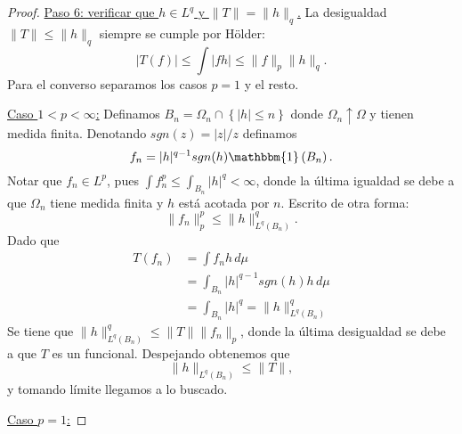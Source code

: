 \documentclass{article}
\theoremstyle{plain}
\theoremstyle{definition}
\newcommand{\1}[1]{\mathbbm{1}\left( #1 \right)}
\newcommand{\abs}[1]{\lvert #1 \rvert}
\newcommand{\norm}[1]{\lVert #1 \rVert}
\begin{document}
\begin{proof}
  \underline{Paso 6: verificar que \(h\in L^q\) y \(\norm{T} = \norm{h}_{q}\).}
  La desigualdad \(\norm{T} \le \norm{h}_{q}\) siempre se cumple por Hölder:
  \begin{displaymath}
    \abs{T(f)} \le \int \abs{fh} \le \norm{f}_{p} \norm{h}_{q}.
  \end{displaymath}
  Para el converso separamos los casos \(p=1\) y el resto.
  
  \noindent\underline{Caso \(1 < p < \infty\):} Definamos \(B_n = \Omega_n \cap \left\{ \abs{h} \le n \right\} \)
  donde \(\Omega_n \uparrow \Omega\) y tienen medida finita. Denotando \(sgn(z) = \abs{z}/z\) 
  definamos 
  \begin{displaymath}
    f_n = \abs{h}^{q-1} sgn(h) \1{B_n}.
  \end{displaymath}
  Notar que \(f_n \in L^p\), pues \(\int f_n^p \le \int_{B_n} \abs{h}^{q} < \infty\), donde
  la última igualdad se debe a que \(\Omega_n\) tiene medida finita y \(h\) está acotada por \(n\).
  Escrito de otra forma:
  \begin{displaymath}
    \norm{f_n}_{p}^{p} \le \norm{h}_{L^q(B_n)}^q.
  \end{displaymath}
  Dado que
  \begin{align*}
    T(f_n) 
    &= \int f_n h \, d\mu
    \\&= \int_{B_n} \abs{h}^{q-1} sgn(h) h \, d\mu
    \\&= \int_{B_n} \abs{h}^{q} = \norm{h}_{L^q(B_n)}^q
  \end{align*}
  Se tiene que \(\norm{h}_{L^q(B_n)}^{q} \le \norm{T} \norm{f_n}_{p}\), donde la
  última desigualdad se debe a que \(T\) es un funcional. Despejando obtenemos que
  \begin{displaymath}
    \norm{h}_{L^{q}(B_n)} \le \norm{T},
  \end{displaymath}
  y tomando límite llegamos a lo buscado.

  \noindent\underline{Caso \(p=1\):}
\end{proof}
\end{document}
